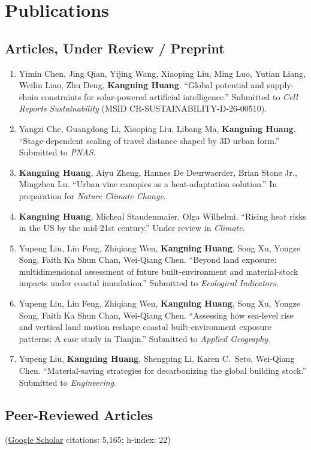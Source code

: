 \documentclass[11pt,letterpaper]{article}
\begin{document}
\section{Publications}

\subsection{Articles, Under Review / Preprint}
\begin{enumerate}
  \item Yimin Chen, Jing Qian, Yijing Wang, Xiaoping Liu, Ming Luo, Yutian Liang, Weilin Liao, Zhu Deng, \textbf{Kangning Huang}. ``Global potential and supply-chain constraints for solar-powered artificial intelligence.'' Submitted to \textit{Cell Reports Sustainability} (MSID CR-SUSTAINABILITY-D-26-00510).
  \item Yangzi Che, Guangdong Li, Xiaoping Liu, Libang Ma, \textbf{Kangning Huang}. ``Stage-dependent scaling of travel distance shaped by 3D urban form.'' Submitted to \textit{PNAS}.
  \item \textbf{Kangning Huang}, Aiyu Zheng, Hannes De Deurwaerder, Brian Stone Jr., Mingzhen Lu. ``Urban vine canopies as a heat-adaptation solution.'' In preparation for \textit{Nature Climate Change}.
  \item \textbf{Kangning Huang}, Micheal Staudenmaier, Olga Wilhelmi. ``Rising heat risks in the US by the mid-21st century.'' Under review in \textit{Climate}.
  \item Yupeng Liu, Lin Feng, Zhiqiang Wen, \textbf{Kangning Huang}, Song Xu, Yongze Song, Faith Ka Shun Chan, Wei-Qiang Chen. ``Beyond land exposure: multidimensional assessment of future built-environment and material-stock impacts under coastal inundation.'' Submitted to \textit{Ecological Indicators}.
  \item Yupeng Liu, Lin Feng, Zhiqiang Wen, \textbf{Kangning Huang}, Song Xu, Yongze Song, Faith Ka Shun Chan, Wei-Qiang Chen. ``Assessing how sea-level rise and vertical land motion reshape coastal built-environment exposure patterns: A case study in Tianjin.'' Submitted to \textit{Applied Geography}.
  \item Yupeng Liu, \textbf{Kangning Huang}, Shengping Li, Karen C.\ Seto, Wei-Qiang Chen. ``Material-saving strategies for decarbonizing the global building stock.'' Submitted to \textit{Engineering}.
\end{enumerate}

\subsection{Peer-Reviewed Articles}
{\small(\href{https://scholar.google.com/citations?user=s_domssAAAAJ&hl=en}{Google Scholar} citations: 5,165; h-index: 22)}
\end{document}
